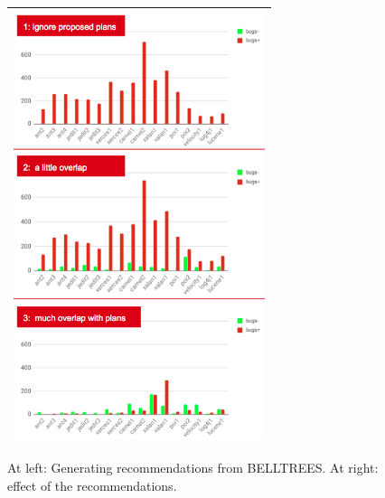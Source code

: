\begin{figure}[!b]
{\begin{minipage}{3in}
 
\begin{tabular}{|p{\linewidth}|}\hline
  \includegraphics[width=2.9in]{figs/belltree.png}\\\hline
 \end{tabular}
 
 \end{minipage}}
 \caption{At left: Generating recommendations from BELLTREES. At right: effect of the recommendations.}\label{fig:xtree}
\end{figure}

